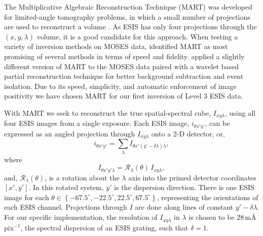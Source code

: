 The Multiplicative Algebraic Reconstruction Technique (MART) was developed for limited-angle tomography problems, in which a small number of projections are used to reconstruct a volume \citep{Okamoto1991,Verhoeven1993}. 
As ESIS has only four projections through the $(x,y,\lambda)$ volume, it is a good candidate for this approach.
When testing a variety of inversion methods on MOSES data, \citet{Fox2011} identified MART as most promising of several methods in terms of speed and fidelity.
\citet{Rust2017} applied a slightly different version of MART to the MOSES data paired with a wavelet based partial reconstruction technique for better background subtraction and event isolation.
Due to its speed, simplicity, and automatic enforcement of image positivity we have chosen MART for our first inversion of Level 3 ESIS data.


With MART we seek to reconstruct the true spatial-spectral cube, $I_{xy\lambda}$, using all four ESIS images from a single exposure.
Each ESIS image, $i_{\theta x'y'}$, can be expressed as an angled projection through $I_{xy\lambda}$ onto a 2-D detector, or,
\begin{equation}
i_{\theta x'y'} = \sum_\lambda I_{\theta x'(y'-\delta\lambda)\lambda},
\end{equation}
where
\begin{equation}
I_{\theta x'y'\lambda} = \mathcal{R}_\lambda(\theta)\,I_{xy\lambda},
\end{equation} 
and, $\mathcal{R}_\lambda (\theta)$, is a rotation about the $\lambda$ axis into the primed detector coordinates $[x',y']$. 
In this rotated system, $y'$ is the dispersion direction.
There is one ESIS image for each $\theta \in \left\{ -67.5^{\circ}, -22.5^{\circ}, 22.5^{\circ},67.5^{\circ} \right\}$, representing the  orientations of each ESIS channel.
Projections through $I$ are done along lines of constant $y'-\delta\lambda$.
For our specific implementation, the resolution of $I_{xy\lambda}$ in $\lambda$ is chosen to be 28\,m\AA\,pix$^{-1}$, the spectral dispersion of an ESIS grating, such that $\delta = 1$. 

